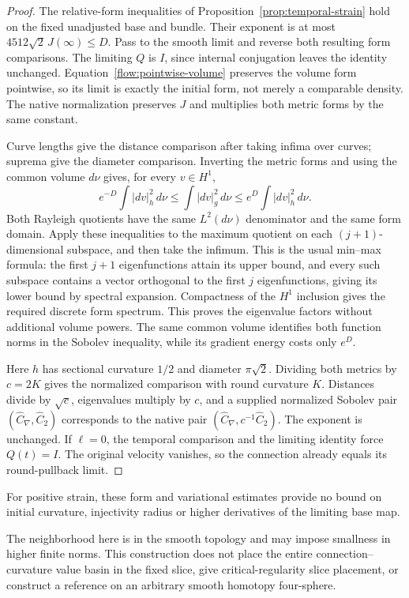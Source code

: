 \documentclass[11pt]{article}
\numberwithin{equation}{section}
\theoremstyle{definition}
\theoremstyle{remark}
\begin{document}
\begin{proof}
The relative-form inequalities of
Proposition~\ref{prop:temporal-strain} hold on the fixed
unadjusted base and bundle. Their exponent is at most
$4512\sqrt2\,J(\infty)\le D$.
Pass to the smooth limit and reverse both resulting form
comparisons. The limiting $Q$ is $I$, since internal
conjugation leaves the identity unchanged.
Equation~\eqref{flow:pointwise-volume} preserves the
volume form pointwise, so its limit is exactly the
initial form, not merely a comparable density.
The native normalization preserves $J$ and multiplies
both metric forms by the same constant.

Curve lengths give the distance comparison after taking
infima over curves; suprema give the diameter comparison.
Inverting the metric forms and using the common volume
$d\nu$ gives, for every $v\in H^1$,
\[
 e^{-D}\int|dv|_h^2\,d\nu
 \le\int|dv|_g^2\,d\nu
 \le e^D\int|dv|_h^2\,d\nu .
\]
Both Rayleigh quotients have the same $L^2(d\nu)$
denominator and the same form domain. Apply these
inequalities to the maximum quotient on each
$(j+1)$-dimensional subspace, and then take the infimum.
This is the usual min--max formula: the first $j+1$
eigenfunctions attain its upper bound, and every such
subspace contains a vector orthogonal to the first $j$
eigenfunctions, giving its lower bound by spectral
expansion. Compactness of the $H^1$ inclusion gives
the required discrete form spectrum.
This proves the eigenvalue factors without additional
volume powers. The same common volume identifies both
function norms in the Sobolev inequality, while its
gradient energy costs only $e^D$.

Here $h$ has sectional curvature $1/2$ and diameter
$\pi\sqrt2$. Dividing both metrics by $c=2K$ gives
the normalized comparison with round curvature $K$.
Distances divide by $\sqrt c$, eigenvalues multiply
by $c$, and a supplied normalized Sobolev pair
$(\widehat C_\nabla,\widehat C_2)$ corresponds to the
native pair $(\widehat C_\nabla,c^{-1}\widehat C_2)$.
The exponent is unchanged. If $\ell=0$, the temporal
comparison and the limiting identity force $Q(t)=I$.
The original velocity vanishes, so the connection
already equals its round-pullback limit.
\end{proof}

For positive strain, these form and variational estimates
provide no bound on initial curvature, injectivity radius
or higher derivatives of the limiting base map.

The neighborhood here is in the smooth topology and may
impose smallness in higher finite norms. This construction
does not place the entire connection--curvature value
basin in the fixed slice, give critical-regularity slice
placement, or construct a reference on an arbitrary
smooth homotopy four-sphere.
\end{document}
